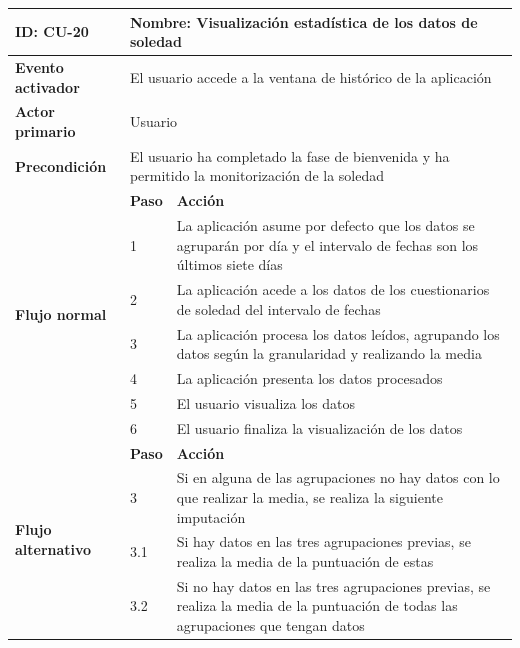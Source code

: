             \begin{table}[h]
                \centering
                \begin{tabularx}{\textwidth}{|l|l|X|}
                    \hline
                    \textbf{ID:} CU-20 & \multicolumn{2}{|X|}{\textbf{Nombre}: Visualización estadística de los datos de soledad} \\
                    \hline
                    \textbf{Evento activador} & \multicolumn{2}{|X|}{El usuario accede a la ventana de histórico de la aplicación} \\
                    \hline
                    \textbf{Actor primario} & \multicolumn{2}{|X|}{Usuario} \\
                    \hline
                    \textbf{Precondición} & \multicolumn{2}{|X|}{El usuario ha completado la fase de bienvenida y ha permitido la monitorización de la soledad} \\
                    \hline
                    \multirow{7}{*}{\textbf{Flujo normal}} & \textbf{Paso} & \textbf{Acción} \\
                    \cline{2-3} & 1 & La aplicación asume por defecto que los datos se agruparán por día y el intervalo de fechas son los últimos siete días \\
                    \cline{2-3} & 2 & La aplicación acede a los datos de los cuestionarios de soledad del intervalo de fechas \\
                    \cline{2-3} & 3 & La aplicación procesa los datos leídos, agrupando los datos según la granularidad y realizando la media \\
                    \cline{2-3} & 4 & La aplicación presenta los datos procesados \\
                    \cline{2-3} & 5 & El usuario visualiza los datos \\
                    \cline{2-3} & 6 & El usuario finaliza la visualización de los datos \\
                    \hline
                    \multirow{5}{*}{\textbf{Flujo alternativo}} & \textbf{Paso} & \textbf{Acción} \\
                    \cline{2-3} & 3 & Si en alguna de las agrupaciones no hay datos con lo que realizar la media, se realiza la siguiente imputación \\
                    \cline{2-3} & 3.1 & Si hay datos en las tres agrupaciones previas, se realiza la media de la puntuación de estas \\
                    \cline{2-3} & 3.2 & Si no hay datos en las tres agrupaciones previas, se realiza la media de la puntuación de todas las agrupaciones que tengan datos \\

\end{tabularx}
\end{table}
